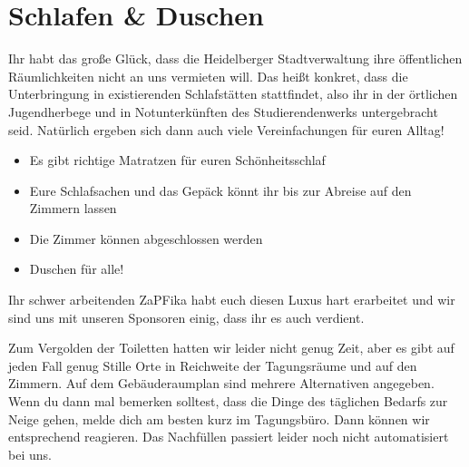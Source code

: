 
\section{Schlafen \& Duschen}
Ihr habt das große Glück, dass die Heidelberger Stadtverwaltung ihre öffentlichen Räumlichkeiten nicht an uns vermieten will. Das heißt konkret, dass die Unterbringung in existierenden Schlafstätten stattfindet, also ihr in der örtlichen Jugendherbege und in Notunterkünften des Studierendenwerks untergebracht seid. Natürlich ergeben sich dann auch viele Vereinfachungen für euren Alltag! \\
\begin{itemize}
  \item Es gibt richtige Matratzen für euren Schönheitsschlaf
  \item Eure Schlafsachen und das Gepäck könnt ihr bis zur Abreise auf den Zimmern lassen
  \item Die Zimmer können abgeschlossen werden
  \item Duschen für alle!
\end{itemize}


Ihr schwer arbeitenden ZaPFika habt euch diesen Luxus hart erarbeitet und wir sind uns mit unseren Sponsoren einig, dass ihr es auch verdient.

Zum Vergolden der Toiletten hatten wir leider nicht genug Zeit, aber es gibt auf jeden Fall genug Stille Orte in Reichweite der Tagungsräume und auf den Zimmern. Auf dem Gebäuderaumplan 
sind mehrere Alternativen angegeben. Wenn du dann mal bemerken solltest, dass die Dinge des täglichen Bedarfs zur Neige gehen, melde dich am besten kurz im Tagungsbüro.  Dann können wir entsprechend reagieren. Das Nachfüllen passiert leider noch nicht automatisiert bei uns.